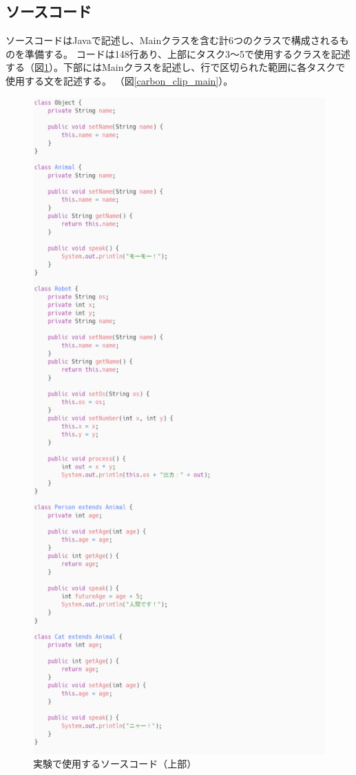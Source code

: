 \documentclass[paper=a4paper,fontsize=11pt]{jlreq}
\begin{document}
    \subsection{ソースコード}
      ソースコードはJavaで記述し、Mainクラスを含む計6つのクラスで構成されるものを準備する。
      コードは148行あり、上部にタスク3～5で使用するクラスを記述する（図\ref{carbon_clip_class}）。下部にはMainクラスを記述し、行で区切られた範囲に各タスクで使用する文を記述する。
      （図\ref{carbon_clip_main}）。
      \begin{figure}[h]
        \centering
        \includegraphics[height=\textheight]{carbon_clip_class.png}
        \caption{実験で使用するソースコード（上部）}
        \label{carbon_clip_class}
      \end{figure}
\end{document}
